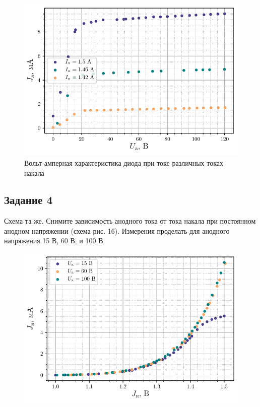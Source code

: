 \begin{figure}[H]
	\centering
    \includegraphics[scale=1]{scripts/fig3}
	\caption{Вольт-амперная характеристика диода при токе различных токах
    накала}
	\label{fig:17}
\end{figure}

\subsection{Задание 4}
Схема та же. Снимите зависимость анодного тока от тока накала при постоянном анодном напряжении (схема рис. 16). Измерения проделать для анодного напряжения 15 В, 60 В, и 100 В.

\begin{figure}[H]
	\centering
    \includegraphics[width=0.85\linewidth]{scripts/fig4}
	\caption{}
	\label{fig:18}
\end{figure}

